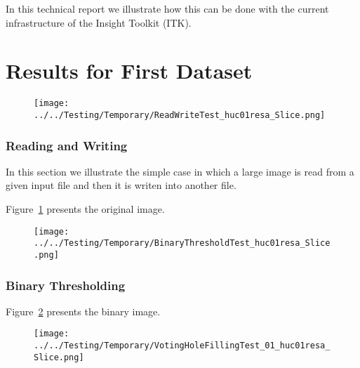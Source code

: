 \documentclass{InsightArticle}
\begin{document}
In this technical report we illustrate how this can be done with the current
infrastructure of the Insight Toolkit (ITK).

\part{Results for First Dataset}

\clearpage
\begin{figure}
\center
\texttt{[image: ../../Testing/Temporary/ReadWriteTest\_huc01resa\_Slice.png]}
\label{fig:OriginalImage}
\end{figure}

\section{Reading and Writing}

In this section we illustrate the simple case in which a large image is read
from a given input file and then it is writen into another file.

\begin{center}

\end{center}

Figure~\ref{fig:OriginalImage} presents the original image.



\clearpage
\begin{figure}
\center
\texttt{[image: ../../Testing/Temporary/BinaryThresholdTest\_huc01resa\_Slice.png]}
\label{fig:BinaryImage}
\end{figure}

\section{Binary Thresholding}

\begin{center}

\end{center}

Figure~\ref{fig:BinaryImage} presents the binary image.



\clearpage
\begin{figure}
\center
\texttt{[image: ../../Testing/Temporary/VotingHoleFillingTest\_01\_huc01resa\_Slice.png]}
\label{fig:IslandRemovalImage}
\end{figure}
\end{document}
